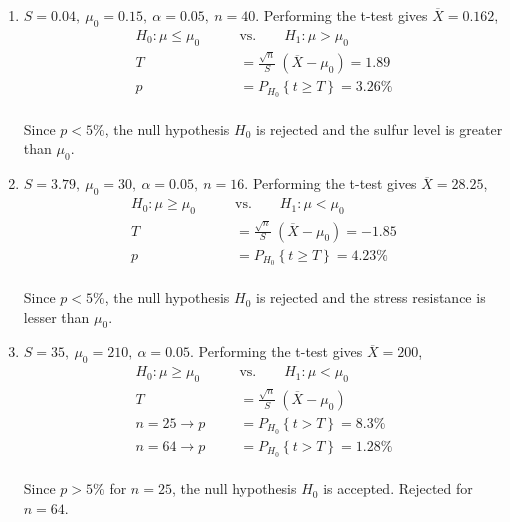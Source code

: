 \begin{enumerate}
	\item $ S = 0.04,\ \mu_0 = 0.15,\ \alpha = 0.05,\ n = 40$. Performing the t-test gives $ \overline{X} = 0.162 $,\\
	\begin{align}
		H_0 : \mu \leq \mu_0 \qquad &\text{vs.} \qquad H_1 : \mu > \mu_0 \nonumber \\
		T &= \frac{\sqrt{n}}{S}\ (\overline{X} - \mu_0) = 1.89 \nonumber \\
		p &= P_{H_0}\left\{t \geq T\right\} = 3.26\% 
	\end{align}\\
	Since $ p < 5\% $, the null hypothesis $ H_0 $ is rejected and the sulfur level is greater than $ \mu_0 $.\\
	
	\item $ S = 3.79,\ \mu_0 = 30,\ \alpha = 0.05,\ n = 16$. Performing the t-test gives $ \overline{X} = 28.25 $,\\
	\begin{align}
		H_0 : \mu \geq \mu_0 \qquad &\text{vs.} \qquad H_1 : \mu < \mu_0 \nonumber \\
		T &= \frac{\sqrt{n}}{S}\ (\overline{X} - \mu_0) = -1.85 \nonumber \\
		p &= P_{H_0}\left\{t \geq T\right\} = 4.23\% 
	\end{align}\\
	Since $ p < 5\% $, the null hypothesis $ H_0 $ is rejected and the stress resistance is lesser than $ \mu_0 $.\\
	
	\item $ S = 35,\ \mu_0 = 210,\ \alpha = 0.05$. Performing the t-test gives $ \overline{X} = 200 $,\\
	\begin{align}
		H_0 : \mu \geq \mu_0 \qquad &\text{vs.} \qquad H_1 : \mu < \mu_0 \nonumber \\
		T &= \frac{\sqrt{n}}{S}\ (\overline{X} - \mu_0) \nonumber \\
		n = 25 \to p &= P_{H_0}\left\{t > T\right\} = 8.3\% \nonumber \\
		n = 64 \to p &= P_{H_0}\left\{t > T\right\} = 1.28\% 
	\end{align}\\
	Since $ p > 5\% $ for $ n = 25 $, the null hypothesis $ H_0 $ is accepted. Rejected for $ n = 64 $.\\
	

\end{enumerate}
